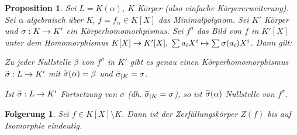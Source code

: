 \documentclass[a4paper,10pt,german]{scrbook}
\theoremstyle{saetze}
\theoremstyle{definitionen}
\newtheorem{Prop}[Def]{Proposition}
\newtheorem{Folg}[Def]{Folgerung}
\begin{document}
\begin{Prop}
\label{3.8}
Sei $L = K(\alpha)$, $K$ Körper (also einfache Körpererweiterung).
Sei $\alpha$ algebraisch über K, $f = f_\alpha \in K[X]$ das Minimalpolynom.
Sei $K'$ Körper und $\sigma: K \rightarrow K'$ ein Körperhomomorhpismus. Sei
$f^\sigma$ das Bild von $f$ in $K'[X]$ unter dem Homomorphismus
$K[X] \rightarrow K'[X], \;\sum a_i X^i \mapsto \sum \sigma(a_i) X^i$. Dann
gilt:

\begin{enum}
\item Zu jeder Nullstelle $\beta$ von $f^\sigma$ in $K'$ gibt es
genau einen Körperhomomorphismus $\widetilde{\sigma}:L \rightarrow K'$ mit
$\widetilde{\sigma}(\alpha) = \beta$ und $\widetilde{\sigma}_{|K} = \sigma$.

\item Ist $\widetilde{\sigma}: L\rightarrow K'$ Fortsetzung von $\sigma$ (dh. $\widetilde{\sigma}_{|K} =
\sigma$), so ist $\widetilde{\sigma}(\alpha)$ Nullstelle von $f^\sigma$.
\end{enum}

\end{Prop}

\begin{Folg}
Sei $f \in K[X] \setminus K$. Dann ist der
Zerfällungskörper $Z(f)$ bis auf Isomorphie eindeutig.

\end{Folg}
\end{document}
